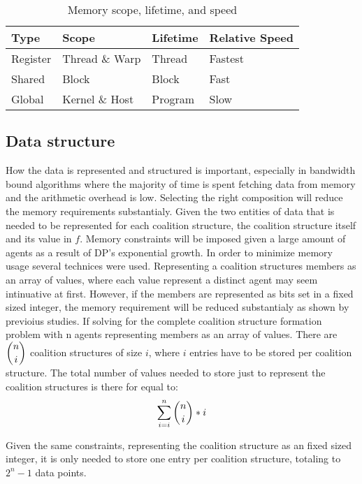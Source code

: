 \documentclass{aamas2012}
\begin{document}
\begin{table}
\centering
\caption{Memory scope, lifetime, and speed \label{mem}}
\begin{tabular}{|l|l|l|l|} \hline
Type&Scope&Lifetime&Relative Speed \\ \hline
Register&Thread \& Warp&Thread&Fastest\\
Shared&Block&Block&Fast\\
Global&Kernel \& Host&Program&Slow\\
\hline\end{tabular}
\end{table}

\subsection{Data structure} %
How the data is represented and structured is important, 
especially in bandwidth bound algorithms where the majority of time
is spent fetching data from memory and the arithmetic overhead is low.
Selecting the right composition will reduce the memory requirements substantialy.
Given the two entities of data that is needed to be represented for each coalition structure, 
the coalition structure itself and its value in $f$. 
Memory constraints will be imposed given a large amount of agents as a result of DP's exponential growth. 
In order to minimize memory usage several technices were used. 
Representing a coalition structures members as an array of values,
where each value represent a distinct agent may seem intinuative at first. 
However, if the members are represented as bits set in a fixed sized integer, the memory
requirement will be reduced substantialy as shown by previoius studies.\cite{boyer2012solving}
If solving for the complete coalition structure formation problem with n agents representing members as an array of values.
There are \begin{math}\dbinom{n}{i}\end{math} coalition structures of size $i$, where
$i$ entries have to be stored per coalition structure.
The total number of values needed to store just to represent the coalition structures is there for equal to:
\begin{displaymath}\sum_{i=i}^{n} \dbinom{n}{i}*i\end{displaymath}

Given the same constraints, representing the coalition structure as an fixed sized integer, it is only 
needed to store one entry per coalition structure, totaling to \begin{math}2^n-1\end{math} data points.
\end{document}
